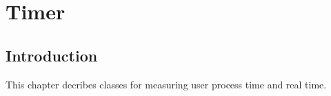 
\ccParDims

\chapter{Timer}
\label{chapterTimer}

\section{Introduction}

This chapter decribes classes for measuring user process time and real time.

